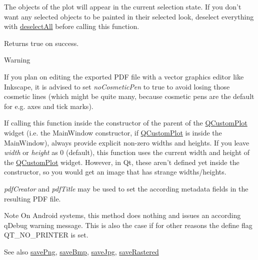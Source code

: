 \-The objects of the plot will appear in the current selection state. \-If you don't want any selected objects to be painted in their selected look, deselect everything with \hyperlink{classQCustomPlot_a9d4808ab925b003054085246c92a257c}{deselect\-All} before calling this function.

\-Returns true on success.

\begin{DoxyWarning}{\-Warning}
\begin{DoxyItemize}
\item \-If you plan on editing the exported \-P\-D\-F file with a vector graphics editor like \-Inkscape, it is advised to set {\itshape no\-Cosmetic\-Pen\/} to true to avoid losing those cosmetic lines (which might be quite many, because cosmetic pens are the default for e.\-g. axes and tick marks). \item \-If calling this function inside the constructor of the parent of the \hyperlink{classQCustomPlot}{\-Q\-Custom\-Plot} widget (i.\-e. the \-Main\-Window constructor, if \hyperlink{classQCustomPlot}{\-Q\-Custom\-Plot} is inside the \-Main\-Window), always provide explicit non-\/zero widths and heights. \-If you leave {\itshape width\/} or {\itshape height\/} as 0 (default), this function uses the current width and height of the \hyperlink{classQCustomPlot}{\-Q\-Custom\-Plot} widget. \-However, in \-Qt, these aren't defined yet inside the constructor, so you would get an image that has strange widths/heights.\end{DoxyItemize}
{\itshape pdf\-Creator\/} and {\itshape pdf\-Title\/} may be used to set the according metadata fields in the resulting \-P\-D\-F file.
\end{DoxyWarning}
\begin{DoxyNote}{\-Note}
\-On \-Android systems, this method does nothing and issues an according q\-Debug warning message. \-This is also the case if for other reasons the define flag \-Q\-T\-\_\-\-N\-O\-\_\-\-P\-R\-I\-N\-T\-E\-R is set.
\end{DoxyNote}
\begin{DoxySeeAlso}{\-See also}
\hyperlink{classQCustomPlot_a7636261aff1f6d25c9da749ece3fc8b8}{save\-Png}, \hyperlink{classQCustomPlot_a6629d9e8e6da4bf18055ee0257fdce9a}{save\-Bmp}, \hyperlink{classQCustomPlot_a490c722092d1771e8ce4a7a73dfd84ab}{save\-Jpg}, \hyperlink{classQCustomPlot_ab528b84cf92baabe29b1d0ef2f77c93e}{save\-Rastered} 
\end{DoxySeeAlso}
